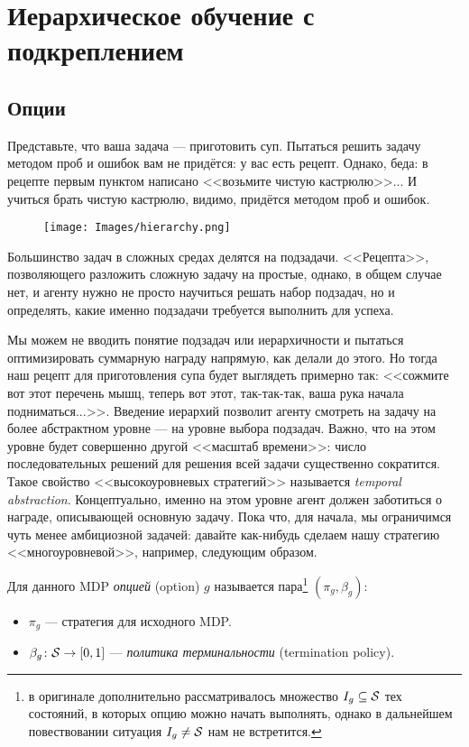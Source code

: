 \section{Иерархическое обучение с подкреплением}

\subsection{Опции}

Представьте, что ваша задача --- приготовить суп. Пытаться решить задачу методом проб и ошибок вам не придётся: у вас есть рецепт. Однако, беда: в рецепте первым пунктом написано <<возьмите чистую кастрюлю>>... И учиться брать чистую кастрюлю, видимо, придётся методом проб и ошибок.

\begin{wrapfigure}{r}{0.5\textwidth}
\vspace{-0.4cm}
\centering
\texttt{[image: Images/hierarchy.png]}
\vspace{-0.5cm}
\end{wrapfigure}

Большинство задач в сложных средах делятся на подзадачи. <<Рецепта>>, позволяющего разложить сложную задачу на простые, однако, в общем случае нет, и агенту нужно не просто научиться решать набор подзадач, но и определять, какие именно подзадачи требуется выполнить для успеха.

Мы можем не вводить понятие подзадач или иерархичности и пытаться оптимизировать суммарную награду напрямую, как делали до этого. Но тогда наш рецепт для приготовления супа будет выглядеть примерно так: <<сожмите вот этот перечень мышц, теперь вот этот, так-так-так, ваша рука начала подниматься...>>. Введение иерархий позволит агенту смотреть на задачу на более абстрактном уровне --- на уровне выбора подзадач. Важно, что на этом уровне будет совершенно другой <<масштаб времени>>: число последовательных решений для решения всей задачи существенно сократится. Такое свойство <<высокоуровневых стратегий>> называется \emph{temporal abstraction}. Концептуально, именно на этом уровне агент должен заботиться о награде, описывающей основную задачу. Пока что, для начала, мы ограничимся чуть менее амбициозной задачей: давайте как-нибудь сделаем нашу стратегию <<многоуровневой>>, например, следующим образом.

\begin{definition}
Для данного MDP \emph{опцией} (option) $g$ называется пара\footnote[*]{в оригинале дополнительно рассматривалось множество $I_g \subseteq \mathcal{S}$ тех состояний, в которых опцию можно начать выполнять, однако в дальнейшем повествовании ситуация $I_g \ne \mathcal{S}$ нам не встретится.} $(\pi_g, \beta_g)$:
\begin{itemize}
    \item $\pi_g$ --- стратегия для исходного MDP.
    \item $\beta_g \colon \mathcal{S} \to [0, 1]$ --- \emph{политика терминальности} (termination policy).
\end{itemize}
\end{definition}

